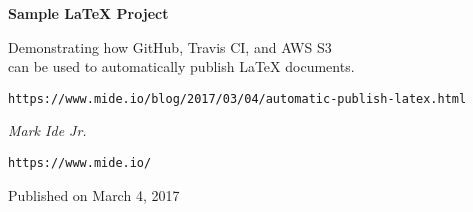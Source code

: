 \documentclass[12pt,letterpaper]{report}
\begin{document}
\begin{titlepage}
  \centering
  {\huge\bfseries Sample \LaTeX{} Project\par}
  \vspace{.5in}
  Demonstrating how GitHub, Travis CI, and AWS S3\\
  can be used to automatically publish \LaTeX{} documents.
  \vfill
  {\texttt{https://www.mide.io/blog/2017/03/04/automatic-publish-latex.html}\par}
  \vfill
  {\Large\itshape Mark Ide Jr.\par}
  {\texttt{https://www.mide.io/}\par}
  {\large Published on March 4, 2017\par}
\end{titlepage}
\end{document}
